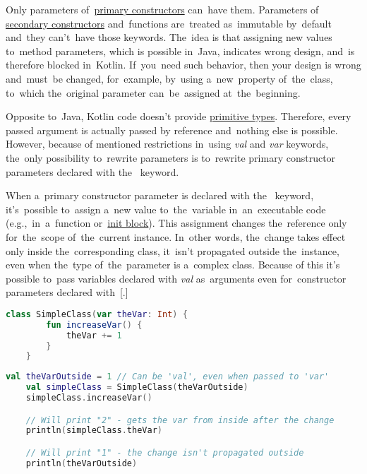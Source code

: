 \label{kotlinvalvar}
Only parameters of~\hyperref[kotlinprimaryconstructor]{primary constructors} can~have them.
Parameters of \hyperref[kotlinsecondaryconstructor]{secondary constructors} and~functions are~treated as~immutable
by~default and~they can't~have those keywords.
The~idea is that assigning new values to~method parameters, which is possible in~Java, indicates wrong design, and~is therefore blocked in~Kotlin.
If~you~need such behavior, then your design is wrong and~must~be changed, for~example, by~using a~new~property of~the~class, to~which the~original parameter can~be~assigned at~the~beginning.

Opposite to~Java, Kotlin code doesn't provide \hyperref[javaprimitivetypes]{primitive types}.
Therefore, every passed argument is actually passed by reference and~nothing else is possible.
However, because of mentioned restrictions in~using \textit{val} and \textit{var} keywords, the~only possibility to~rewrite parameters is to~rewrite primary constructor parameters declared with the~ keyword.

When a~primary constructor parameter is declared with the~ keyword, it's~possible to~assign a~new value to~the~variable in~an~executable code (e.g.,~in~a~function or~\hyperref[kotlininitblock]{init block}).
This assignment changes the~reference only for~the~scope of~the~current instance.
In~other words, the~change takes effect only inside the~corresponding class, it~isn't propagated outside the~instance, even when the~type of~the~parameter is a~complex class.
Because of this it's possible to~pass variables declared with \textit{val} as~arguments even for~constructor parameters declared with~[.]

\example
\begin{lstlisting}[language=Kotlin, title={Class with \textit{var} parameter in the primary constructor}]
    class SimpleClass(var theVar: Int) {
        fun increaseVar() {
            theVar += 1
        }
    }
\end{lstlisting}
\newpage

\begin{lstlisting}[language=Kotlin, title={Behavior}]
    val theVarOutside = 1 // Can be 'val', even when passed to 'var'
    val simpleClass = SimpleClass(theVarOutside)
    simpleClass.increaseVar()

    // Will print "2" - gets the var from inside after the change
    println(simpleClass.theVar)

    // Will print "1" - the change isn't propagated outside
    println(theVarOutside)
\end{lstlisting}

